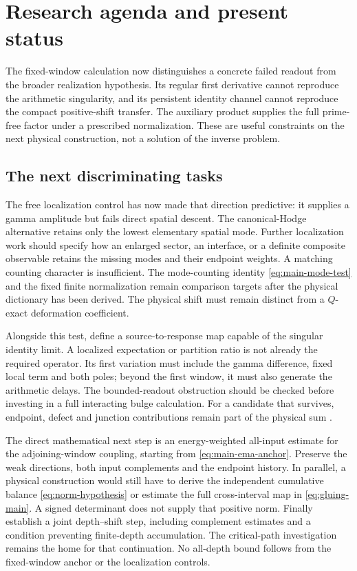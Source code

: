 \section{Research agenda and present status}\label{sec:outlook}

The fixed-window calculation now distinguishes a concrete failed
readout from the broader realization hypothesis. Its regular
first derivative cannot reproduce the arithmetic singularity, and
its persistent identity channel cannot reproduce the compact
positive-shift transfer. The auxiliary product supplies the full
prime-free factor under a prescribed normalization. These are
useful constraints on the next physical construction, not a
solution of the inverse problem.

\subsection{The next discriminating tasks}

The free localization control has now made that direction predictive:
it supplies a gamma amplitude but fails direct spatial descent.
The canonical-Hodge alternative retains only the lowest elementary
spatial mode. Further localization work should specify how an
enlarged sector, an interface, or a definite composite observable
retains the missing modes and their endpoint weights. A matching
counting character is insufficient. The mode-counting identity
\eqref{eq:main-mode-test} and the fixed finite normalization remain
comparison targets after the physical dictionary has been derived.
The physical shift must remain distinct from a $Q$-exact deformation
coefficient.

Alongside this test, define a source-to-response map capable of the
singular identity limit. A localized expectation or partition ratio
is not already the required operator. Its first variation must
include the gamma difference, fixed local term and both poles;
beyond the first window, it must also generate the arithmetic
delays. The bounded-readout obstruction should be checked before
investing in a full interacting bulge calculation. For a candidate
that survives, endpoint, defect and junction contributions remain
part of the physical sum \cite[Section~S8.4]{Supplement}.

The direct mathematical next step is an energy-weighted all-input
estimate for the adjoining-window coupling, starting from
\eqref{eq:main-ema-anchor}. Preserve the weak directions, both input
complements and the endpoint history. In parallel, a physical
construction would still have to derive the independent cumulative
balance \eqref{eq:norm-hypothesis} or estimate the full cross-interval
map in \eqref{eq:gluing-main}. A signed determinant
does not supply that positive norm. Finally establish a joint
depth--shift step, including complement estimates and a condition
preventing finite-depth accumulation. The critical-path
investigation remains the home for that continuation. No
all-depth bound follows from the fixed-window anchor or the
localization controls.

